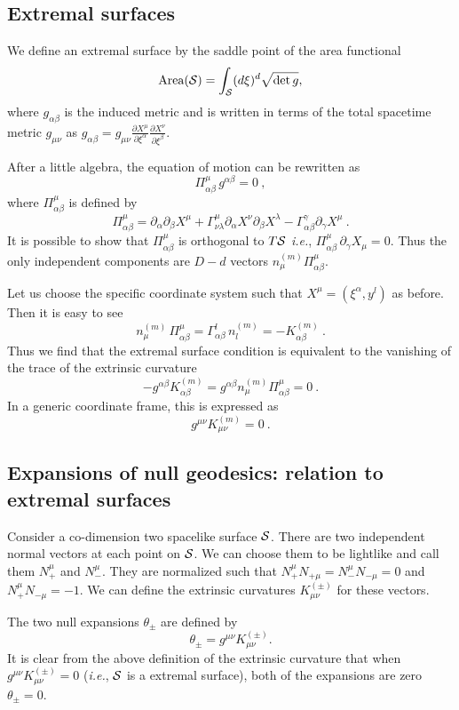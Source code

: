 \documentclass[12pt]{article}
\newcommand{\be}{\begin{equation}}
\newcommand{\ee}{\end{equation}}
\def\ie{{\it i.e.}}
\def\s{\sigma}
\def\CS{{\cal S}}
\def\f#1#2{{\frac{#1}{#2}}}
\def\f#1#2{{\frac{#1}{#2}}}
\def\ms{\CS}
\def\s{\sqrt}
\def\de{\partial}
\def\f {\frac}
\def\ap{\alpha}
\begin{document}
\subsection{Extremal surfaces}
We define an extremal surface by the saddle point of the area
functional
%
\be \mbox{Area}(\ms)=\int_{\ms}
(d\xi)^{d}\s{\det{g}}, \ee
%
where $g_{\ap\beta}$ is the induced
metric and is written in terms of the total spacetime metric
$g_{\mu\nu}$ as $g_{\ap\beta}=g_{\mu\nu}\f{\de X^\mu}{\de
\xi^\ap}\f{\de X^\nu}{\de \xi^\beta}$.

 After a little algebra, the equation of motion can be rewritten as
%
\be \Pi^\mu_{\ap\beta}\, g^{\ap\beta}=0 \ , \ee
%
where $\Pi^\mu_{\ap\beta}$ is defined by
%
\be \Pi^\mu_{\ap\beta}=\de_\ap\de_\beta
X^\mu+\Gamma^\mu_{\nu\lambda}\de_\ap X^\nu \de_\beta X^\lambda
-\Gamma^\gamma_{\ap\beta}\de_\gamma X^\mu\ . \ee
%
It is possible to show that $\Pi^\mu_{\ap\beta}$ is orthogonal
to $T\ms$ \ie, $\Pi^\mu_{\ap\beta}\, \de_\gamma X_\mu=0$. Thus the
only independent components are $D-d$ vectors $n^{(m)}_\mu
\Pi^\mu_{\ap\beta}$.

Let us choose the specific coordinate system such that
$X^\mu=(\xi^\ap,y^l)$ as before. Then it is easy to see
%
\be n^{(m)}_\mu \,\Pi^\mu_{\ap\beta}=\Gamma^l_{\ap\beta}\,
n^{(m)}_{l}=-K^{(m)}_{\ap\beta}\ . \ee
%
Thus we find that the extremal surface condition is
equivalent to the vanishing of the trace of the extrinsic curvature
%
\be -g^{\ap\beta}K^{(m)}_{\ap\beta} =g^{\ap\beta}n^{(m)}_\mu
\Pi^\mu_{\ap\beta} =0\ .\ee
%
In a generic coordinate frame, this is expressed as
%
\be g^{\mu\nu}K^{(m)}_{\mu\nu}=0 \ .\ee
%

\subsection{Expansions of null geodesics: relation to extremal surfaces}

Consider a co-dimension two spacelike surface ${\cal S}$. There are
two independent normal vectors at each point on ${\cal S}$. We can
choose them to be lightlike and call them $N_{+}^\mu$ and
$N_{-}^\mu$. They are normalized such that $N_{+}^\mu N_{+
\mu}=N_{-}^\mu N_{- \mu}=0$ and $N_{+}^\mu N_{-\mu}=-1$. We can
define the extrinsic curvatures $K^{(\pm)}_{\mu\nu}$
 for these vectors.

The two null expansions $\theta_{\pm}$  are defined by
%
 \be \theta_{\pm}=g^{\mu\nu}K^{(\pm)}_{\mu\nu}. \ee
%
It is clear from the above definition of the extrinsic curvature
that when $g^{\mu\nu}K^{(\pm)}_{\mu\nu}=0$ (\ie, ${\cal S}$ is a
extremal surface), both of the expansions are zero $\theta_{\pm}=0$.
\end{document}
